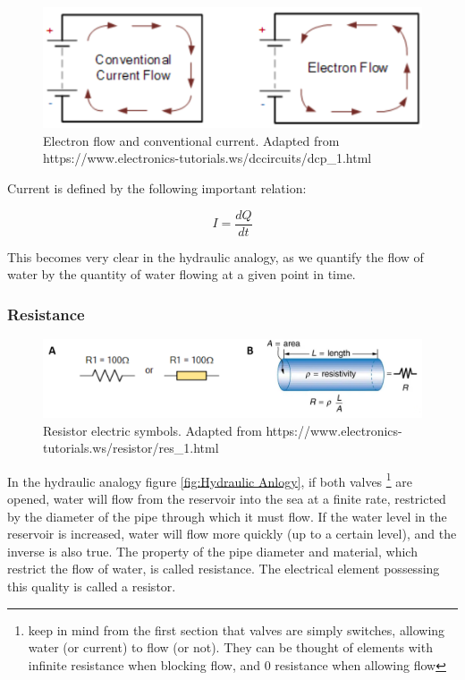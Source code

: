 \begin{figure}[H]
    \centering
    \includegraphics[width=0.85\linewidth]{../../Figures/Electron_Flow.PNG}
    \caption{Electron flow and conventional current. Adapted from https://www.electronics-tutorials.ws/dccircuits/dcp\_1.html}
    \label{fig:Resistors}
\end{figure}

Current is defined by the following important relation: 

\begin{equation}
    I = \frac{dQ}{dt}
\end{equation}

This becomes very clear in the hydraulic analogy, as we quantify the flow of water by the quantity of water flowing at a given point in time. 

\subsubsection{Resistance}

\begin{figure}[H]
    \centering
    \includegraphics[width=0.65\linewidth]{../../Figures/Resistors.PNG}
    \caption{Resistor electric symbols. Adapted from https://www.electronics-tutorials.ws/resistor/res\_1.html}
    \label{fig:Resistors}
\end{figure}

In the hydraulic analogy figure \ref{fig:Hydraulic Anlogy}, if both valves \footnote{keep in mind from the first section that valves are simply switches, allowing water (or current) to flow (or not). They can be thought of elements with infinite resistance when blocking flow, and 0 resistance when allowing flow} are opened, water will flow from the reservoir into the sea at a finite rate, restricted by the diameter of the pipe through which it must flow. If the water level in the reservoir is increased, water will flow more quickly (up to a certain level), and the inverse is also true. The property of the pipe diameter and material, which restrict the flow of water, is called resistance. The electrical element possessing this quality is called a resistor. 

